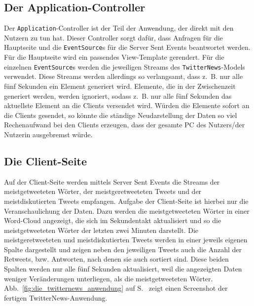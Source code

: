 \subsection{Der Application-Controller} %
\label{sub:der_application_controller}

Der \lstinline|Application|-Controller ist der Teil der Anwendung, der direkt mit den Nutzern zu tun hat.
Dieser Controller sorgt dafür, dass Anfragen für die Hauptseite und die \lstinline|EventSource|s für die Server Sent Events beantwortet werden.
Für die Hauptseite wird ein passendes View-Template gerendert.
Für die einzelnen \lstinline|EventSource|s werden die jeweiligen Streams des \lstinline|TwitterNews|-Models verwendet.
Diese Streams werden allerdings so verlangsamt, dass z.~B. nur alle fünf Sekunden ein Element generiert wird.
Elemente, die in der Zwischenzeit generiert werden, werden ignoriert, sodass z.~B. nur alle fünf Sekunden das aktuellste Element an die Clients versendet wird.
Würden die Elemente sofort an die Clients gesendet, so könnte die ständige Neudarstellung der Daten so viel Rechenaufwand bei den Clients erzeugen, dass der gesamte PC des Nutzers/der Nutzerin ausgebremst würde.


\subsection{Die Client-Seite} %
\label{sub:die_client_seite}

Auf der Client-Seite werden mittels Server Sent Events die Streams der meistgetweeteten Wörter, der meistgeretweeteten Tweets und der meistdiskutierten Tweets empfangen.
Aufgabe der Client-Seite ist hierbei nur die Veranschaulichung der Daten.
Dazu werden die meistgetweeteten Wörter in einer Word-Cloud angezeigt, die sich im Sekundentakt aktualisiert und so die meistgetweeteten Wörter der letzten zwei Minuten darstellt.
Die meistgeretweeteten und meistdiskutierten Tweets werden in einer jeweils eigenen Spalte dargestellt und zeigen neben den jeweiligen Tweets auch die Anzahl der Retweets, bzw. Antworten, nach denen sie auch sortiert sind.
Diese beiden Spalten werden nur alle fünf Sekunden aktualisiert, weil die angezeigten Daten weniger Veränderungen unterliegen, als die meistgetweeteten Wörter.
Abb.~\ref{fig:die_twitternews_anwendung} auf S.~\pageref{fig:die_twitternews_anwendung} zeigt einen Screenshot der fertigen TwitterNews-Anwendung.



